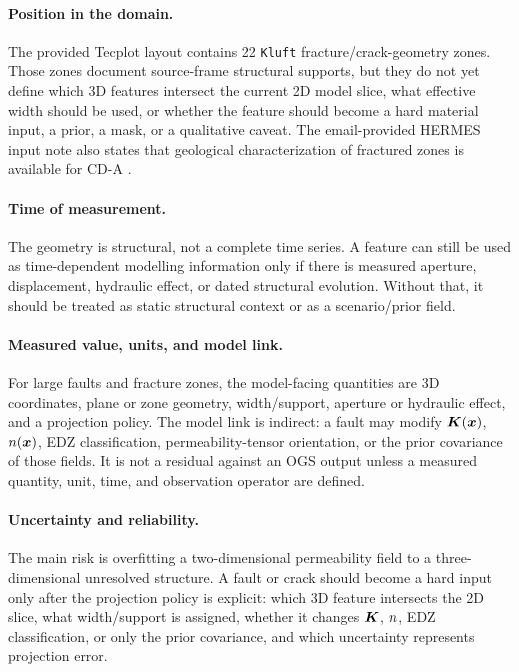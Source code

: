 \paragraph{Position in the domain.}
The provided Tecplot layout contains 22 \texttt{Kluft} fracture/crack-geometry zones.
Those zones document source-frame structural supports, but they do not yet define
which 3D features intersect the current 2D model slice, what effective width should
be used, or whether the feature should become a hard material input, a prior, a
mask, or a qualitative caveat.  The email-provided HERMES input note also states that
geological characterization of fractured zones is available for CD-A
\citep[PDF p.~5]{HermesInput2024Email}.

\paragraph{Time of measurement.}
The geometry is structural, not a complete time series.  A feature can still be
used as time-dependent modelling information only if there is measured aperture,
displacement, hydraulic effect, or dated structural evolution.  Without that, it
should be treated as static structural context or as a scenario/prior field.

\paragraph{Measured value, units, and model link.}
For large faults and fracture zones, the model-facing quantities are 3D
coordinates, plane or zone geometry, width/support, aperture or hydraulic effect,
and a projection policy.  The model link is indirect: a fault may modify
\(\bm{K}(\bm{x})\), \(n(\bm{x})\), EDZ classification, permeability-tensor orientation,
or the prior covariance of those fields.  It is not a residual against an OGS
output unless a measured quantity, unit, time, and observation operator are
defined.

\paragraph{Uncertainty and reliability.}
The main risk is overfitting a two-dimensional permeability field to a
three-dimensional unresolved structure.  A fault or crack should become a hard input
only after the projection policy is explicit: which 3D feature intersects the 2D
slice, what width/support is assigned, whether it changes \(\bm{K}\), \(n\), EDZ
classification, or only the prior covariance, and which uncertainty represents
projection error.

